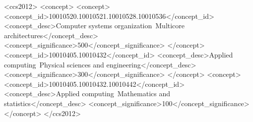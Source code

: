 \documentclass[sigconf]{acmart}
\begin{document}
%
%
\begin{CCSXML}
<ccs2012>
<concept>
<concept>
<concept_id>10010520.10010521.10010528.10010536</concept_id>
<concept_desc>Computer systems organization~Multicore architectures</concept_desc>
<concept_significance>500</concept_significance>
</concept>
<concept_id>10010405.10010432</concept_id>
<concept_desc>Applied computing~Physical sciences and engineering</concept_desc>
<concept_significance>300</concept_significance>
</concept>
<concept>
<concept_id>10010405.10010432.10010442</concept_id>
<concept_desc>Applied computing~Mathematics and statistics</concept_desc>
<concept_significance>100</concept_significance>
</concept>
</ccs2012>
\end{CCSXML}





\maketitle


\end{document}
